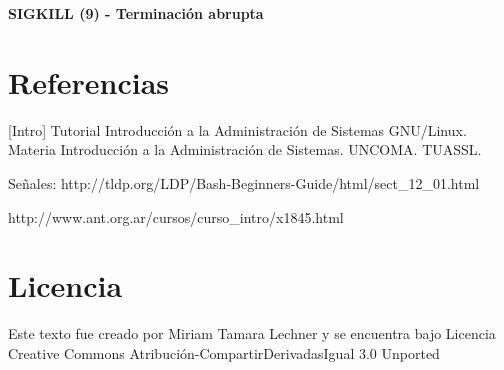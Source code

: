 \documentclass[12pt]{article}
\begin{document}
\textbf{SIGKILL (9) - Terminación abrupta}






\section*{Referencias}

[Intro] Tutorial Introducción a la Administración de Sistemas GNU/Linux. Materia Introducción
a la Administración de Sistemas. UNCOMA. TUASSL. 

Señales: http://tldp.org/LDP/Bash-Beginners-Guide/html/sect\_12\_01.html

http://www.ant.org.ar/cursos/curso\_intro/x1845.html

\section*{Licencia}

Este texto fue creado por Miriam Tamara Lechner y se encuentra bajo 
Licencia Creative Commons Atribución-CompartirDerivadasIgual 3.0 Unported
\end{document}
